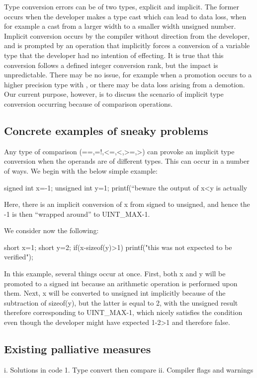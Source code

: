 \documentclass[11pt,letterpaper]{article}
\begin{document}
Type conversion errors can be of two types, explicit and implicit. The former occurs when the developer makes a type cast which can lead to data loss, when for example a cast from a larger width to a smaller width unsigned number. Implicit conversion occurs by the compiler without direction from the developer, and is prompted by an operation that implicitly forces a conversion of a variable type that the developer had no intention of effecting. It is true that this conversion follows a defined integer conversion rank, but the impact is unpredictable. There may be no issue, for example when a promotion occurs to a higher precision type with , or there may be data loss arising from a demotion. Our current purpose, however, is to discuss the scenario of implicit type conversion occurring because of comparison operations.


\subsection{Concrete examples of sneaky problems}
\Blindtext[3]
Any type of comparison (==,=!,<=,<,>=,>) can provoke an implicit type conversion when the operands are of different types. This can occur in a number of ways. We begin with the below simple example:

signed int x=-1;
unsigned int y=1;
printf(“beware the output of x<y is actually %

Here, there is an implicit conversion of x from signed to unsigned, and hence the -1 is then “wrapped around” to UINT_MAX-1. 

We consider now the following:

short x=1;
short y=2;
if(x-sizeof(y)>1){
  		printf("this was not expected to be verified");}	

In this example, several things occur at once. First, both x and y will be promoted to a signed int because an arithmetic operation is performed upon them. Next, x will be converted to unsigned int implicitly because of the subtraction of sizeof(y), but the latter is equal to 2, with the unsigned result therefore corresponding to UINT_MAX-1, which nicely satisfies the condition even though the developer might have expected 1-2>1 and therefore false.

\subsection{Existing palliative measures}
\Blindtext[4]

i.	Solutions in code
1.	Type convert then compare
ii.	Compiler flags and warnings
\end{document}
